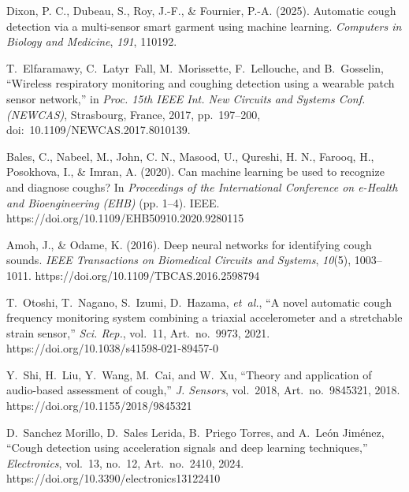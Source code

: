 \documentclass[12pt, a4paper, openany]{report}
\begin{document}
\tableofcontents









\begin{thebibliography}{}

Dixon, P. C., Dubeau, S., Roy, J.-F., \& Fournier, P.-A. (2025).
Automatic cough detection via a multi-sensor smart garment using machine learning.
\textit{Computers in Biology and Medicine}, \textit{191}, 110192.

T.~Elfaramawy, C.~Latyr~Fall, M.~Morissette, F.~Lellouche, and B.~Gosselin,
``Wireless respiratory monitoring and coughing detection using a wearable patch sensor network,''
in \textit{Proc. 15th IEEE Int. New Circuits and Systems Conf. (NEWCAS)},
Strasbourg, France, 2017, pp.~197--200, doi:~10.1109/NEWCAS.2017.8010139.

Bales, C., Nabeel, M., John, C. N., Masood, U., Qureshi, H. N., Farooq, H., Posokhova, I., \& Imran, A. (2020).
Can machine learning be used to recognize and diagnose coughs?
In \textit{Proceedings of the International Conference on e-Health and Bioengineering (EHB)} (pp. 1--4).
IEEE.
https://doi.org/10.1109/EHB50910.2020.9280115

Amoh, J., \& Odame, K. (2016).
Deep neural networks for identifying cough sounds.
\textit{IEEE Transactions on Biomedical Circuits and Systems}, \textit{10}(5), 1003--1011.
https://doi.org/10.1109/TBCAS.2016.2598794

T.~Otoshi, T.~Nagano, S.~Izumi, D.~Hazama, \textit{et~al.}, ``A novel automatic cough frequency monitoring system combining a triaxial accelerometer and a stretchable strain sensor,'' \textit{Sci. Rep.}, vol.~11, Art.~no.~9973, 2021.
https://doi.org/10.1038/s41598-021-89457-0

Y.~Shi, H.~Liu, Y.~Wang, M.~Cai, and W.~Xu, ``Theory and application of audio-based assessment of cough,'' \textit{J. Sensors}, vol.~2018, Art.~no.~9845321, 2018.
https://doi.org/10.1155/2018/9845321

D.~Sanchez Morillo, D.~Sales Lerida, B.~Priego Torres, and A.~Le\'on Jim\'enez, ``Cough detection using acceleration signals and deep learning techniques,'' \textit{Electronics}, vol.~13, no.~12, Art.~no.~2410, 2024.
https://doi.org/10.3390/electronics13122410


\end{thebibliography}
\end{document}
